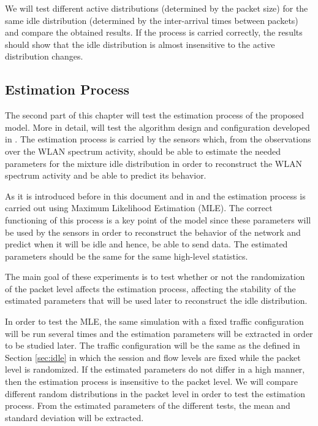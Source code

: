 We will test different active distributions (determined by the packet size) for the same idle distribution (determined by the inter-arrival times between packets) and compare the obtained results. If the process is carried correctly, the results should show that the idle distribution is almost insensitive to the active distribution changes.

\subsection{Estimation Process} \label{sec:MLE}
The second part of this chapter will test the estimation process of the proposed model. More in detail, will test the algorithm design and configuration developed in \cite{marcello}. The estimation process is carried by the sensors which, from the observations over the \acs{WLAN} spectrum activity, should be able to estimate the needed parameters for the mixture idle distribution in order to reconstruct the \acs{WLAN} spectrum activity and be able to predict its behavior.

As it is introduced before in this document and in \cite{ioannis} and \cite{marcello} the estimation process is carried out using Maximum Likelihood Estimation (\acs{MLE}). The correct functioning of this process is a key point of the model since these parameters will be used by the sensors in order to reconstruct the behavior of the network and predict when it will be idle and hence, be able to send data. The estimated parameters should be the same for the same high-level statistics.

The main goal of these experiments is to test whether or not the randomization of the packet level affects the estimation process, affecting the stability of the estimated parameters that will be used later to reconstruct the idle distribution.

In order to test the \acs{MLE}, the same simulation with a fixed traffic configuration will be run several times and the estimation parameters will be extracted in order to be studied later. The traffic configuration will be the same as the defined in Section \ref{sec:idle} in which the session and flow levels are fixed while the packet level is randomized. If the estimated parameters do not differ in a high manner, then the estimation process is insensitive to the packet level. We will compare different random distributions in the packet level in order to test the estimation process. From the estimated parameters of the different tests, the mean and standard deviation will be extracted.


